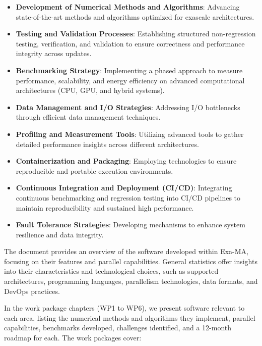 \begin{itemize}
    \item \textbf{Development of Numerical Methods and Algorithms}: Advancing state-of-the-art methods and algorithms optimized for exascale architectures.
    \item \textbf{Testing and Validation Processes}: Establishing structured non-regression testing, verification, and validation to ensure correctness and performance integrity across updates.
    \item \textbf{Benchmarking Strategy}: Implementing a phased approach to measure performance, scalability, and energy efficiency on advanced computational architectures (CPU, GPU, and hybrid systems).
    \item \textbf{Data Management and I/O Strategies}: Addressing I/O bottlenecks through efficient data management techniques.
    \item \textbf{Profiling and Measurement Tools}: Utilizing advanced tools to gather detailed performance insights across different architectures.
    \item \textbf{Containerization and Packaging}: Employing technologies to ensure reproducible and portable execution environments.
    \item \textbf{Continuous Integration and Deployment (CI/CD)}: Integrating continuous benchmarking and regression testing into CI/CD pipelines to maintain reproducibility and sustained high performance.
    \item \textbf{Fault Tolerance Strategies}: Developing mechanisms to enhance system resilience and data integrity.
\end{itemize}

The document provides an overview of the software developed within Exa-MA, focusing on their features and parallel capabilities. General statistics offer insights into their characteristics and technological choices, such as supported architectures, programming languages, parallelism technologies, data formats, and DevOps practices.

In the work package chapters (WP1 to WP6), we present software relevant to each area, listing the numerical methods and algorithms they implement, parallel capabilities, benchmarks developed, challenges identified, and a 12-month roadmap for each. The work packages cover:

